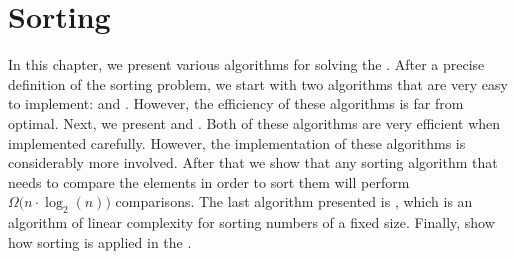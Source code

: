 \chapter{Sorting}
In this chapter, we present various algorithms for solving the .
After a precise definition of the sorting problem, we start with two algorithms
that are very easy to implement:  and .  However, the
efficiency of these algorithms is far from optimal.  Next, we present  and 
.  Both of these algorithms are very efficient when implemented carefully.
However, the implementation of these algorithms is considerably more involved.
After that we show that any sorting algorithm that needs to compare the elements in order to sort them will
perform $\Omega\bigl(n \cdot \log_2(n)\bigr)$ comparisons.  The last algorithm presented is , which is an
algorithm of linear complexity for sorting numbers of a fixed size.
Finally, show how sorting is applied in the .

